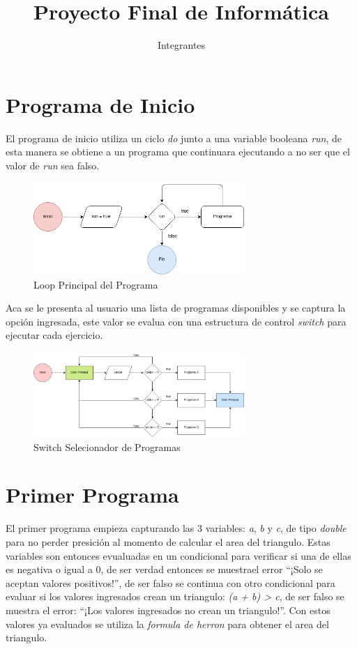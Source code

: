 \documentclass{article}
\title{Proyecto Final de Informática}
\author{Integrantes}
\begin{document}
    \maketitle
    
\section{Programa de Inicio}

El programa de inicio utiliza un ciclo \emph{do} junto a una variable booleana \emph{run}, de esta manera se obtiene a un programa que continuara ejecutando a no ser que el valor de \emph{run} sea falso. 

\begin{figure}[h]
    \centering
        \centering
    \includegraphics[width=8cm]{loop_inicio}
    \centering
        \centering
        \caption{Loop Principal del Programa}
\end{figure}

Aca se le presenta al usuario una lista de programas disponibles y se captura la opción ingresada, este valor se evalua con una estructura de control \emph{switch} para ejecutar cada ejercicio.

\begin{figure}[h]
    \centering
    \includegraphics[width=8cm]{switch_programa}
    \caption{Switch Selecionador de Programas}
\end{figure}

\section{Primer Programa}

El primer programa empieza capturando las 3 variables: \emph{a}, \emph{b} y \emph{c}, de tipo \emph{double} para no perder presición al momento de calcular el area del triangulo. Estas variables son entonces evualuadas en un condicional para verificar si una de ellas es negativa o igual a 0, de ser verdad entonces se muestrael error ``¡Solo se aceptan valores positivos!'', de ser falso se continua con otro condicional para evaluar si los valores ingresados crean un triangulo: \emph{(a + b) > c}, de ser falso se muestra el error: ``¡Los valores ingresados no crean un triangulo!''. Con estos valores ya evaluados se utiliza la \emph{formula de herron} para obtener el area del triangulo.
\end{document}
